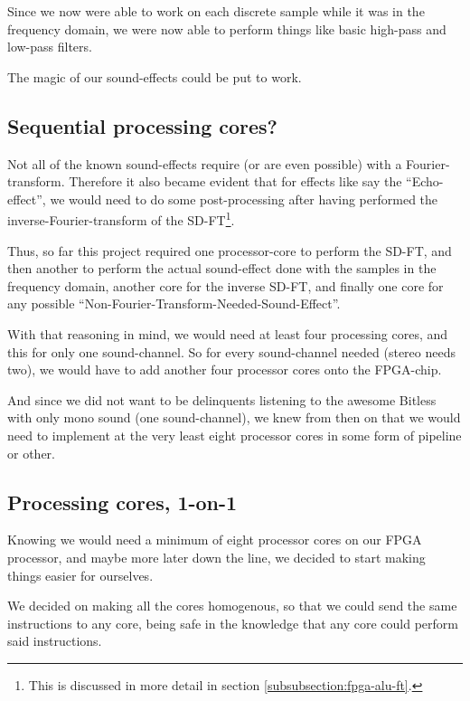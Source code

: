 Since we now were able to work on each discrete sample while it was in the
frequency domain, we were now able to perform things like basic high-pass and
low-pass filters.

The magic of our sound-effects could be put to work.

\FloatBarrier
\subsection{Sequential processing cores?}

Not all of the known sound-effects require (or are even possible) with a
Fourier-transform. Therefore it also became evident that for effects like say
the ``Echo-effect'', we would need to do some post-processing after having
performed the inverse-Fourier-transform of the 
SD-FT\footnote{This is discussed in more detail in section
\ref{subsubsection:fpga-alu-ft}.}.

Thus, so far this project required one processor-core to perform the SD-FT, and
then another to perform the actual sound-effect done with the samples in the
frequency domain, another core for the inverse SD-FT, and finally one core for
any possible 
``Non-Fourier-Transform-Needed-Sound-Effect''.

With that reasoning in mind, we would need at least four processing cores, and
this for only one sound-channel. So for every sound-channel needed (stereo needs
two), we would have to add another four processor cores onto the FPGA-chip.

And since we did not want to be delinquents listening to the awesome 
Bitless with only mono sound (one sound-channel), we knew from then on that we
would need to implement at the very least eight processor cores in some form of
pipeline or other.

\FloatBarrier
\subsection{Processing cores, 1-on-1}

Knowing we would need a minimum of eight processor cores on our FPGA processor,
and maybe more later down the line, we decided to start making things easier
for ourselves.

We decided on making all the cores homogenous, so that we could send the same
instructions to any core, being safe in the knowledge that any core could
perform said instructions.

